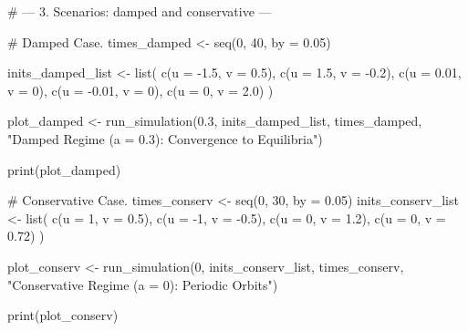 \documentclass[12pt]{amsart}
\numberwithin{equation}{section}
\begin{document}
\begin{rcode}
# --- 3. Scenarios: damped and conservative ---

# Damped Case.
times_damped <- seq(0, 40, by = 0.05)

inits_damped_list <- list(
c(u = -1.5, v = 0.5),
c(u = 1.5,  v = -0.2),
c(u = 0.01, v = 0),   
c(u = -0.01, v = 0),  
c(u = 0,    v = 2.0)  
)

plot_damped <- run_simulation(0.3, inits_damped_list, times_damped, "Damped Regime (a = 0.3): Convergence to Equilibria")

print(plot_damped)

# Conservative Case.
times_conserv <- seq(0, 30, by = 0.05)
inits_conserv_list <- list(
c(u = 1, v = 0.5),    
c(u = -1, v = -0.5),  
c(u = 0, v = 1.2),    
c(u = 0, v = 0.72)    
)

plot_conserv <- run_simulation(0, inits_conserv_list, times_conserv, "Conservative Regime (a = 0): Periodic Orbits")

print(plot_conserv)
\end{rcode}



\vspace{0.5cm}

\end{document}
